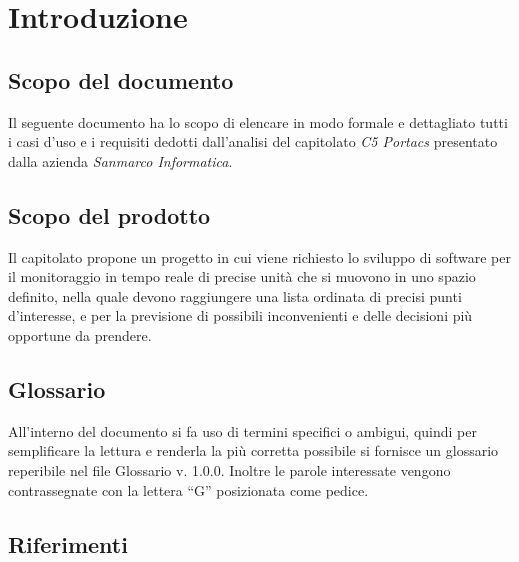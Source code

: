 \section{Introduzione}
\subsection{Scopo del documento}
Il seguente documento ha lo scopo di elencare in modo formale e dettagliato tutti i casi d’uso e i requisiti dedotti dall’analisi del capitolato \textit{C5 Portacs} presentato dalla azienda \textit{Sanmarco Informatica}.

\subsection{Scopo del prodotto}
Il capitolato propone un progetto in cui viene richiesto lo sviluppo di software per il monitoraggio in tempo reale di precise unità che si muovono in uno spazio definito, nella quale devono raggiungere una lista ordinata di precisi punti d’interesse, e per la previsione di possibili inconvenienti e delle decisioni più opportune da prendere.

\subsection{Glossario}
All’interno del documento si fa uso di termini specifici o ambigui, quindi per semplificare la lettura e renderla la più corretta possibile si fornisce un glossario reperibile nel file Glossario v. 1.0.0. Inoltre le parole interessate vengono contrassegnate con la lettera “G” posizionata come pedice.

\subsection{Riferimenti}